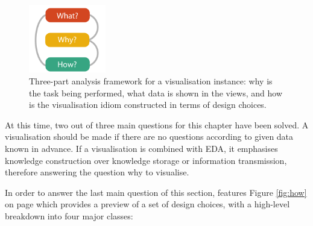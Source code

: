 \begin{figure}[!htb]
\centering
\includegraphics[width=0.3\textwidth,keepaspectratio]{images/basics/analysis-framework.png}
\caption[
    Three-part analysis framework for a visualisation instance: why is the task being performed, what data is shown in the views, and how is the visualisation idiom constructed in terms of design choices .
]{Three-part analysis framework for a visualisation instance: why is the task being performed, what data is shown in the views, and how is the visualisation idiom constructed in terms of design choices.}
\label{fig:an-framework}
\end{figure}

At this time, two out of three main questions for this chapter have been solved. A visualisation should be made if there are no questions according to given data known in advance. If a visualisation is combined with \ac{EDA}, it emphasises knowledge construction over knowledge storage or information transmission, therefore answering the question why to visualise.

In order to answer the last main question of this section, \citeauthor{Munzner2014} features Figure \ref{fig:how} on page \pageref{fig:how} which provides a preview of a set of design choices, with a high-level breakdown into four major classes:

